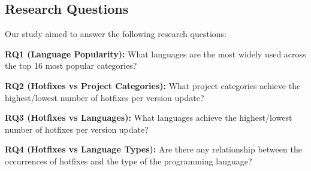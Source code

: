 \documentclass{sig-alternate}
\begin{document}
\subsection{Research Questions}
\noindent Our study aimed to answer the following research questions:

\noindent\textbf{RQ1 (Language Popularity):} What languages are the most widely used across the top 16 most popular categories?

\noindent\textbf{RQ2 (Hotfixes vs Project Categories):} What project categories achieve the highest/lowest number of hotfixes per version update?

\noindent\textbf{RQ3 (Hotfixes vs Languages):} What languages achieve the highest/lowest number of hotfixes per version update?

\noindent\textbf{RQ4 (Hotfixes vs Language Types):} Are there any relationship between the occurrences of hotfixes and the type of the programming language?
\end{document}
